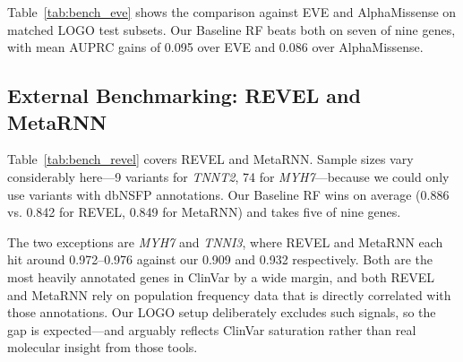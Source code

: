 \documentclass[conference]{IEEEtran}
\begin{document}
Table~\ref{tab:bench_eve} shows the comparison against EVE and AlphaMissense on matched LOGO test subsets. Our Baseline RF beats both on seven of nine genes, with mean AUPRC gains of 0.095 over EVE and 0.086 over AlphaMissense.

\begin{table}[h]
\centering
\caption{AUPRC Comparison: Our Models vs.\ EVE and AlphaMissense. 
  Best value per gene shown in \textbf{bold}.}
\label{tab:bench_eve}
\end{table}

\subsection{External Benchmarking: REVEL and MetaRNN}

Table~\ref{tab:bench_revel} covers REVEL and MetaRNN. Sample sizes vary considerably here---9 variants for \textit{TNNT2}, 74 for \textit{MYH7}---because we could only use variants with dbNSFP annotations. Our Baseline RF wins on average (0.886 vs. 0.842 for REVEL, 0.849 for MetaRNN) and takes five of nine genes.

The two exceptions are \textit{MYH7} and \textit{TNNI3}, where REVEL and MetaRNN each hit around 0.972--0.976 against our 0.909 and 0.932 respectively. Both are the most heavily annotated genes in ClinVar by a wide margin, and both REVEL and MetaRNN rely on population frequency data that is directly correlated with those annotations. Our LOGO setup deliberately excludes such signals, so the gap is expected---and arguably reflects ClinVar saturation rather than real molecular insight from those tools.
\end{document}

